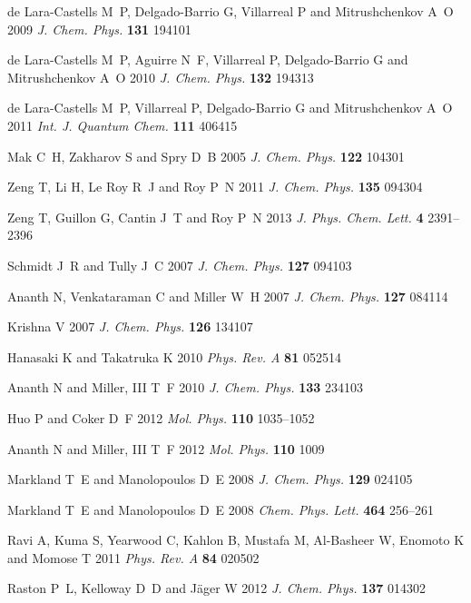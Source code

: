 \documentclass[12pt]{iopart}
\begin{document}
\begin{thebibliography}{100}
{de Lara-Castells} M~P, {Delgado-Barrio} G, Villarreal P and Mitrushchenkov A~O
  2009 {\em J. Chem. Phys.\/} {\bf 131} 194101

{de Lara-Castells} M~P, Aguirre N~F, Villarreal P, {Delgado-Barrio} G and
  Mitrushchenkov A~O 2010 {\em J. Chem. Phys.\/} {\bf 132} 194313

{de Lara-Castells} M~P, Villarreal P, {Delgado-Barrio} G and Mitrushchenkov A~O
  2011 {\em Int. J. Quantum Chem.\/} {\bf 111} 406415

Mak C~H, Zakharov S and Spry D~B 2005 {\em J. Chem. Phys.\/} {\bf 122} 104301

Zeng T, Li H, {Le Roy} R~J and Roy P~N 2011 {\em J. Chem. Phys.\/} {\bf 135}
  094304

Zeng T, Guillon G, Cantin J~T and Roy P~N 2013 {\em J. Phys. Chem. Lett.\/}
  {\bf 4} 2391--2396

Schmidt J~R and Tully J~C 2007 {\em J. Chem. Phys.\/} {\bf 127} 094103

Ananth N, Venkataraman C and Miller W~H 2007 {\em J. Chem. Phys.\/} {\bf 127}
  084114

Krishna V 2007 {\em J. Chem. Phys.\/} {\bf 126} 134107

Hanasaki K and Takatruka K 2010 {\em Phys. Rev. A\/} {\bf 81} 052514

Ananth N and {Miller, III} T~F 2010 {\em J. Chem. Phys.\/} {\bf 133} 234103

Huo P and Coker D~F 2012 {\em Mol. Phys.\/} {\bf 110} 1035--1052

Ananth N and {Miller, III} T~F 2012 {\em Mol. Phys.\/} {\bf 110} 1009

Markland T~E and Manolopoulos D~E 2008 {\em J. Chem. Phys.\/} {\bf 129} 024105

Markland T~E and Manolopoulos D~E 2008 {\em Chem. Phys. Lett.\/} {\bf 464}
  256--261

Ravi A, Kuma S, Yearwood C, Kahlon B, Mustafa M, {Al-Basheer} W, Enomoto K and
  Momose T 2011 {\em Phys. Rev. A\/} {\bf 84} 020502

Raston P~L, Kelloway D~D and J{\"a}ger W 2012 {\em J. Chem. Phys.\/} {\bf 137}
  014302


\end{thebibliography}
\end{document}
